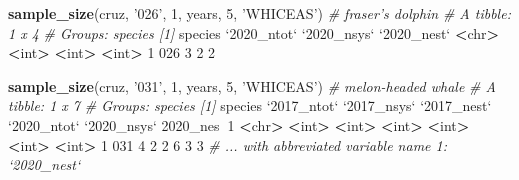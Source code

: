 \documentclass[
]{book}
\newenvironment{Shaded}{\begin{snugshade}}{\end{snugshade}}
\newcommand{\CommentTok}[1]{\textcolor[rgb]{0.56,0.35,0.01}{\textit{#1}}}
\newcommand{\DataTypeTok}[1]{\textcolor[rgb]{0.13,0.29,0.53}{#1}}
\newcommand{\DecValTok}[1]{\textcolor[rgb]{0.00,0.00,0.81}{#1}}
\newcommand{\ErrorTok}[1]{\textcolor[rgb]{0.64,0.00,0.00}{\textbf{#1}}}
\newcommand{\KeywordTok}[1]{\textcolor[rgb]{0.13,0.29,0.53}{\textbf{#1}}}
\newcommand{\NormalTok}[1]{#1}
\newcommand{\OperatorTok}[1]{\textcolor[rgb]{0.81,0.36,0.00}{\textbf{#1}}}
\newcommand{\StringTok}[1]{\textcolor[rgb]{0.31,0.60,0.02}{#1}}
\begin{document}
\begin{Shaded}
\begin{Highlighting}[]
\KeywordTok{sample_size}\NormalTok{(cruz, }\StringTok{'026'}\NormalTok{, }\DecValTok{1}\NormalTok{, years, }\DecValTok{5}\NormalTok{, }\StringTok{'WHICEAS'}\NormalTok{) }\CommentTok{# fraser's dolphin}
\CommentTok{# A tibble: 1 x 4}
\CommentTok{# Groups:   species [1]}
\NormalTok{  species }\StringTok{`}\DataTypeTok{2020_ntot}\StringTok{`} \StringTok{`}\DataTypeTok{2020_nsys}\StringTok{`} \StringTok{`}\DataTypeTok{2020_nest}\StringTok{`}
  \OperatorTok{<}\NormalTok{chr}\OperatorTok{>}\StringTok{         }\ErrorTok{<}\NormalTok{int}\OperatorTok{>}\StringTok{       }\ErrorTok{<}\NormalTok{int}\OperatorTok{>}\StringTok{       }\ErrorTok{<}\NormalTok{int}\OperatorTok{>}
\DecValTok{1} \DecValTok{026}               \DecValTok{3}           \DecValTok{2}           \DecValTok{2}

\KeywordTok{sample_size}\NormalTok{(cruz, }\StringTok{'031'}\NormalTok{, }\DecValTok{1}\NormalTok{, years, }\DecValTok{5}\NormalTok{, }\StringTok{'WHICEAS'}\NormalTok{) }\CommentTok{# melon-headed whale}
\CommentTok{# A tibble: 1 x 7}
\CommentTok{# Groups:   species [1]}
\NormalTok{  species }\StringTok{`}\DataTypeTok{2017_ntot}\StringTok{`} \StringTok{`}\DataTypeTok{2017_nsys}\StringTok{`} \StringTok{`}\DataTypeTok{2017_nest}\StringTok{`} \StringTok{`}\DataTypeTok{2020_ntot}\StringTok{`} \StringTok{`}\DataTypeTok{2020_nsys}\StringTok{`} \DecValTok{2020}\NormalTok{_nes}\OperatorTok{~}\DecValTok{1}
  \OperatorTok{<}\NormalTok{chr}\OperatorTok{>}\StringTok{         }\ErrorTok{<}\NormalTok{int}\OperatorTok{>}\StringTok{       }\ErrorTok{<}\NormalTok{int}\OperatorTok{>}\StringTok{       }\ErrorTok{<}\NormalTok{int}\OperatorTok{>}\StringTok{       }\ErrorTok{<}\NormalTok{int}\OperatorTok{>}\StringTok{       }\ErrorTok{<}\NormalTok{int}\OperatorTok{>}\StringTok{      }\ErrorTok{<}\NormalTok{int}\OperatorTok{>}
\DecValTok{1} \DecValTok{031}               \DecValTok{4}           \DecValTok{2}           \DecValTok{2}           \DecValTok{6}           \DecValTok{3}          \DecValTok{3}
\CommentTok{# ... with abbreviated variable name 1: `2020_nest`}


\end{Highlighting}
\end{Shaded}
\end{document}
